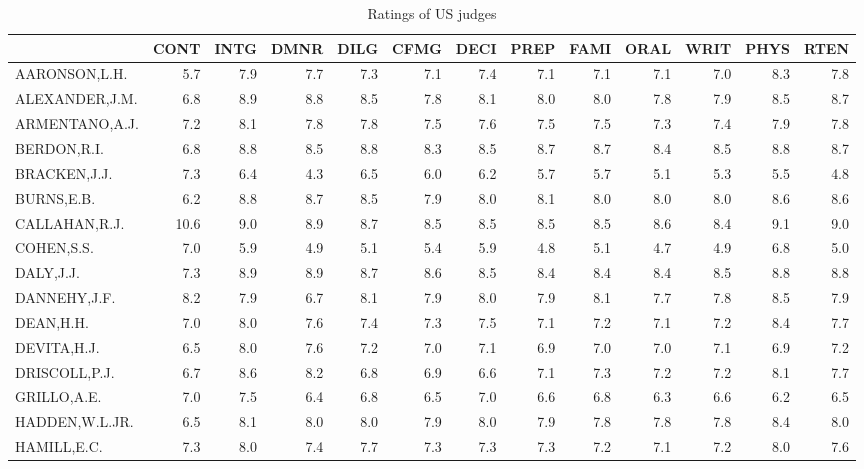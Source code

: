 \documentclass[]{article}
\begin{document}
\begin{table}

\caption{\label{tab:view}Ratings of US judges}
\centering
\fontsize{6}{8}\selectfont
\begin{tabular}[t]{lrrrrrrrrrrrr}
\toprule
  & CONT & INTG & DMNR & DILG & CFMG & DECI & PREP & FAMI & ORAL & WRIT & PHYS & RTEN\\
\midrule
\rowcolor{gray!6}  AARONSON,L.H. & 5.7 & 7.9 & 7.7 & 7.3 & 7.1 & 7.4 & 7.1 & 7.1 & 7.1 & 7.0 & 8.3 & 7.8\\
ALEXANDER,J.M. & 6.8 & 8.9 & 8.8 & 8.5 & 7.8 & 8.1 & 8.0 & 8.0 & 7.8 & 7.9 & 8.5 & 8.7\\
\rowcolor{gray!6}  ARMENTANO,A.J. & 7.2 & 8.1 & 7.8 & 7.8 & 7.5 & 7.6 & 7.5 & 7.5 & 7.3 & 7.4 & 7.9 & 7.8\\
BERDON,R.I. & 6.8 & 8.8 & 8.5 & 8.8 & 8.3 & 8.5 & 8.7 & 8.7 & 8.4 & 8.5 & 8.8 & 8.7\\
\rowcolor{gray!6}  BRACKEN,J.J. & 7.3 & 6.4 & 4.3 & 6.5 & 6.0 & 6.2 & 5.7 & 5.7 & 5.1 & 5.3 & 5.5 & 4.8\\
\addlinespace
BURNS,E.B. & 6.2 & 8.8 & 8.7 & 8.5 & 7.9 & 8.0 & 8.1 & 8.0 & 8.0 & 8.0 & 8.6 & 8.6\\
\rowcolor{gray!6}  CALLAHAN,R.J. & 10.6 & 9.0 & 8.9 & 8.7 & 8.5 & 8.5 & 8.5 & 8.5 & 8.6 & 8.4 & 9.1 & 9.0\\
COHEN,S.S. & 7.0 & 5.9 & 4.9 & 5.1 & 5.4 & 5.9 & 4.8 & 5.1 & 4.7 & 4.9 & 6.8 & 5.0\\
\rowcolor{gray!6}  DALY,J.J. & 7.3 & 8.9 & 8.9 & 8.7 & 8.6 & 8.5 & 8.4 & 8.4 & 8.4 & 8.5 & 8.8 & 8.8\\
DANNEHY,J.F. & 8.2 & 7.9 & 6.7 & 8.1 & 7.9 & 8.0 & 7.9 & 8.1 & 7.7 & 7.8 & 8.5 & 7.9\\
\addlinespace
\rowcolor{gray!6}  DEAN,H.H. & 7.0 & 8.0 & 7.6 & 7.4 & 7.3 & 7.5 & 7.1 & 7.2 & 7.1 & 7.2 & 8.4 & 7.7\\
DEVITA,H.J. & 6.5 & 8.0 & 7.6 & 7.2 & 7.0 & 7.1 & 6.9 & 7.0 & 7.0 & 7.1 & 6.9 & 7.2\\
\rowcolor{gray!6}  DRISCOLL,P.J. & 6.7 & 8.6 & 8.2 & 6.8 & 6.9 & 6.6 & 7.1 & 7.3 & 7.2 & 7.2 & 8.1 & 7.7\\
GRILLO,A.E. & 7.0 & 7.5 & 6.4 & 6.8 & 6.5 & 7.0 & 6.6 & 6.8 & 6.3 & 6.6 & 6.2 & 6.5\\
\rowcolor{gray!6}  HADDEN,W.L.JR. & 6.5 & 8.1 & 8.0 & 8.0 & 7.9 & 8.0 & 7.9 & 7.8 & 7.8 & 7.8 & 8.4 & 8.0\\
\addlinespace
HAMILL,E.C. & 7.3 & 8.0 & 7.4 & 7.7 & 7.3 & 7.3 & 7.3 & 7.2 & 7.1 & 7.2 & 8.0 & 7.6\\

\end{tabular}
\end{table}
\end{document}
